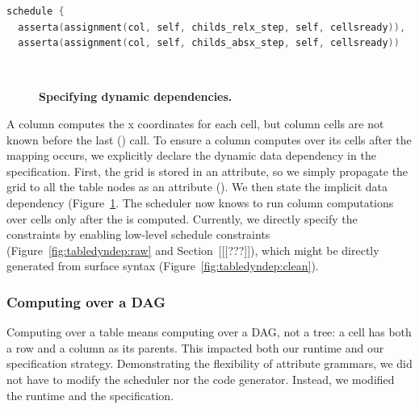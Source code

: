 \newsavebox{\tabledynb}
\begin{lrbox}{\tabledynb}%
\centering
\begin{lstlisting}[language=C++,morekeywords={spawn,join,reverse,parallel_for},xleftmargin=10.0ex]
schedule { 
  asserta(assignment(col, self, childs_relx_step, self, cellsready)),
  asserta(assignment(col, self, childs_absx_step, self, cellsready))
\end{lstlisting}
\end{lrbox}


\begin{figure}
\\
\caption{\textbf{Specifying dynamic dependencies.}}
\label{fig:tabledyndep}
\end{figure}

A column computes the x coordinates for each cell, but column cells are not known before the last () call. To ensure a column computes over its cells after the mapping occurs, we explicitly declare the dynamic data dependency in the specification. First, the grid is stored in an attribute, so we simply propagate the grid to all the table nodes as an attribute (). We then state the implicit data dependency (Figure~\ref{fig:tabledyndep}. The scheduler now knows to run column computations over cells only after the  is computed. Currently, we directly specify the constraints by enabling low-level schedule constraints (Figure~\ref{fig:tabledyndep:raw} and Section~[[[???]]), which might be directly generated from surface syntax (Figure~\ref{fig:tabledyndep:clean}).

\subsubsection{Computing over a DAG}
Computing over a table means computing over a DAG, not a tree: a cell has both a row and a column as its parents. This impacted both our runtime and our specification strategy. Demonstrating the flexibility of attribute grammars, we did not have to modify the scheduler nor the code generator. Instead, we modified the runtime and the specification.

